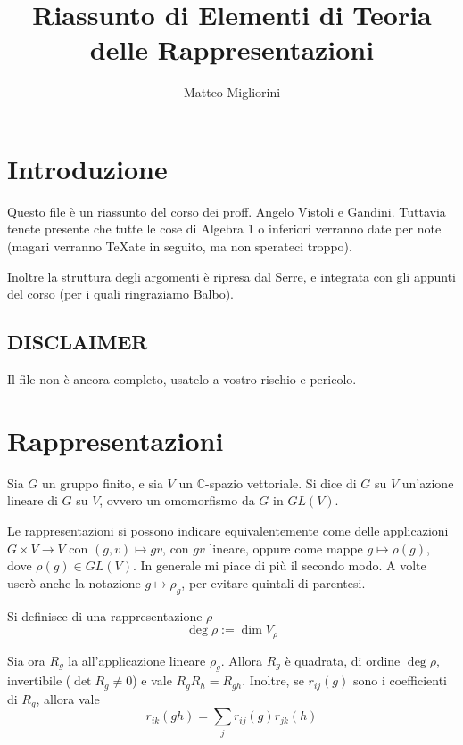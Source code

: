\documentclass[a4paper,10pt,oneside]{math_article}
\title{Riassunto di Elementi di Teoria delle Rappresentazioni}
\author{Matteo Migliorini}
\date{}
\begin{document}
 
 
 \maketitle
 
 \cleardoublepage	
 \tableofcontents
 \cleardoublepage
 
  \section*{Introduzione}
   Questo file è un riassunto del corso dei proff. Angelo Vistoli e Gandini. Tuttavia tenete presente che tutte le cose di Algebra 1 o inferiori verranno date per note (magari verranno \TeX ate in seguito, ma non sperateci troppo).
   
   Inoltre la struttura degli argomenti è ripresa dal Serre, e integrata con gli appunti del corso (per i quali ringraziamo Balbo).

   \subsection*{DISCLAIMER}
    Il file non è ancora completo, usatelo a vostro rischio e pericolo.
 
  \section{Rappresentazioni}
    \begin{mydef}
      Sia $G$ un gruppo finito, e sia $V$ un $\mathbb C$-spazio vettoriale. Si dice  di $G$ su $V$ un'azione lineare di $G$ su $V$, ovvero un omomorfismo da $G$ in $GL(V)$.
    \end{mydef}
    
    Le rappresentazioni si possono indicare equivalentemente come delle applicazioni $G \times V \rightarrow V$ con $(g,v)\mapsto gv$, con $gv$ lineare, oppure come mappe $g \mapsto \rho(g)$, dove $\rho(g) \in GL(V)$. In generale mi piace di più il secondo modo. A volte userò anche la notazione $g \mapsto \rho_g$, per evitare quintali di parentesi.
    
    \begin{mydef}
     Si definisce  di una rappresentazione $\rho$
     \[\deg \rho := \dim V_\rho\]
    \end{mydef}

    
    Sia ora $R_g$ la  all'applicazione lineare $\rho_g$. Allora $R_g$ è quadrata, di ordine $\deg \rho$, invertibile ($\det R_g \ne 0$) e vale $R_g R_h=R_{gh}$. Inoltre, se $r_{ij}(g)$ sono i coefficienti di $R_g$, allora vale
    \[
     r_{ik}(gh)=\sum_j r_{ij}(g)r_{jk}(h)
    \]
\end{document}

